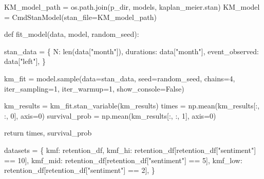 \documentclass[
  letterpaper,
  DIV=11,
  numbers=noendperiod]{scrartcl}
\newenvironment{Shaded}{\begin{snugshade}}{\end{snugshade}}
\newcommand{\BuiltInTok}[1]{\textcolor[rgb]{0.00,0.23,0.31}{#1}}
\newcommand{\ControlFlowTok}[1]{\textcolor[rgb]{0.00,0.23,0.31}{#1}}
\newcommand{\DecValTok}[1]{\textcolor[rgb]{0.68,0.00,0.00}{#1}}
\newcommand{\KeywordTok}[1]{\textcolor[rgb]{0.00,0.23,0.31}{#1}}
\newcommand{\NormalTok}[1]{\textcolor[rgb]{0.00,0.23,0.31}{#1}}
\newcommand{\OperatorTok}[1]{\textcolor[rgb]{0.37,0.37,0.37}{#1}}
\newcommand{\StringTok}[1]{\textcolor[rgb]{0.13,0.47,0.30}{#1}}
\newcommand{\VariableTok}[1]{\textcolor[rgb]{0.07,0.07,0.07}{#1}}
\begin{document}
\begin{Shaded}
\begin{Highlighting}[]
\NormalTok{KM\_model\_path }\OperatorTok{=}\NormalTok{ os.path.join(p\_dir, }\StringTok{\textquotesingle{}models\textquotesingle{}}\NormalTok{, }\StringTok{\textquotesingle{}kaplan\_meier.stan\textquotesingle{}}\NormalTok{)}
\NormalTok{KM\_model }\OperatorTok{=}\NormalTok{ CmdStanModel(stan\_file}\OperatorTok{=}\NormalTok{KM\_model\_path)}

\KeywordTok{def}\NormalTok{ fit\_model(data, model, random\_seed):}
   
\NormalTok{    stan\_data }\OperatorTok{=}\NormalTok{ \{}
        \StringTok{\textquotesingle{}N\textquotesingle{}}\NormalTok{: }\BuiltInTok{len}\NormalTok{(data[}\StringTok{"month"}\NormalTok{]),}
        \StringTok{\textquotesingle{}durations\textquotesingle{}}\NormalTok{: data[}\StringTok{"month"}\NormalTok{],}
        \StringTok{\textquotesingle{}event\_observed\textquotesingle{}}\NormalTok{: data[}\StringTok{"left"}\NormalTok{],}
\NormalTok{    \}}
    
    
\NormalTok{    km\_fit }\OperatorTok{=}\NormalTok{ model.sample(data}\OperatorTok{=}\NormalTok{stan\_data, seed}\OperatorTok{=}\NormalTok{random\_seed, chains}\OperatorTok{=}\DecValTok{4}\NormalTok{, iter\_sampling}\OperatorTok{=}\DecValTok{1}\NormalTok{, iter\_warmup}\OperatorTok{=}\DecValTok{1}\NormalTok{, show\_console}\OperatorTok{=}\VariableTok{False}\NormalTok{)}
    

\NormalTok{    km\_results }\OperatorTok{=}\NormalTok{ km\_fit.stan\_variable(}\StringTok{\textquotesingle{}km\_results\textquotesingle{}}\NormalTok{)}
\NormalTok{    times }\OperatorTok{=}\NormalTok{ np.mean(km\_results[:, :, }\DecValTok{0}\NormalTok{], axis}\OperatorTok{=}\DecValTok{0}\NormalTok{)}
\NormalTok{    survival\_prob }\OperatorTok{=}\NormalTok{ np.mean(km\_results[:, :, }\DecValTok{1}\NormalTok{], axis}\OperatorTok{=}\DecValTok{0}\NormalTok{)}

    \ControlFlowTok{return}\NormalTok{ times, survival\_prob}

\NormalTok{datasets }\OperatorTok{=}\NormalTok{ \{}
    \StringTok{\textquotesingle{}kmf\textquotesingle{}}\NormalTok{: retention\_df,  }
    \StringTok{\textquotesingle{}kmf\_hi\textquotesingle{}}\NormalTok{: retention\_df[retention\_df[}\StringTok{"sentiment"}\NormalTok{] }\OperatorTok{==} \DecValTok{10}\NormalTok{],  }
    \StringTok{\textquotesingle{}kmf\_mid\textquotesingle{}}\NormalTok{: retention\_df[retention\_df[}\StringTok{"sentiment"}\NormalTok{] }\OperatorTok{==} \DecValTok{5}\NormalTok{],  }
    \StringTok{\textquotesingle{}kmf\_low\textquotesingle{}}\NormalTok{: retention\_df[retention\_df[}\StringTok{"sentiment"}\NormalTok{] }\OperatorTok{==} \DecValTok{2}\NormalTok{],  }
\NormalTok{\}}


\end{Highlighting}
\end{Shaded}
\end{document}
